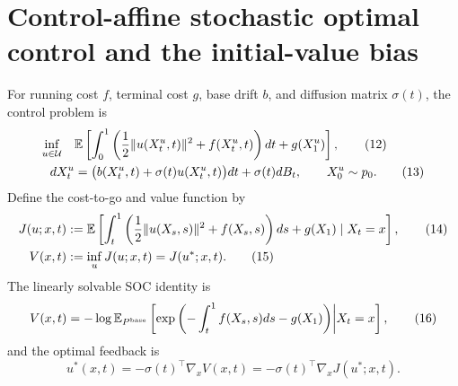 \section{Control-affine stochastic optimal control and the initial-value bias}

For running cost $f$, terminal cost $g$, base drift $b$, and diffusion matrix $\sigma(t)$, the control problem is
\begin{align*}
 \inf_{u\in\mathcal U}\quad
 &\mathbb{E}\left[
 \int_0^1\left(\frac12\|u(X_t^u,t)\|^2+f(X_t^u,t)\right)dt
 +g(X_1^u)
 \right],
 \tag{12}\\
 dX_t^u&=\bigl(b(X_t^u,t)+\sigma(t)u(X_t^u,t)\bigr)dt+\sigma(t)dB_t,
 \qquad X_0^u\sim p_0.
 \tag{13}
\end{align*}
Define the cost-to-go and value function by
\begin{align*}
 J(u;x,t)
 &:=\mathbb{E}\left[
 \int_t^1\left(\frac12\|u(X_s,s)\|^2+f(X_s,s)\right)ds+g(X_1)
 \mid X_t=x
 \right],
 \tag{14}\\
 V(x,t)&:=\inf_uJ(u;x,t)=J(u^*;x,t).
 \tag{15}
\end{align*}
The linearly solvable SOC identity is
\begin{equation*}
 V(x,t)=-\log\mathbb{E}_{P^{\mathrm{base}}}
 \left[
 \exp\left(-\int_t^1f(X_s,s)ds-g(X_1)\right)
 \middle|X_t=x
 \right],
 \tag{16}
\end{equation*}
and the optimal feedback is
\begin{equation*}
 u^*(x,t)=-\sigma(t)^\top\nabla_xV(x,t)
 =-\sigma(t)^\top\nabla_xJ(u^*;x,t).
 \tag{17}
\end{equation*}

